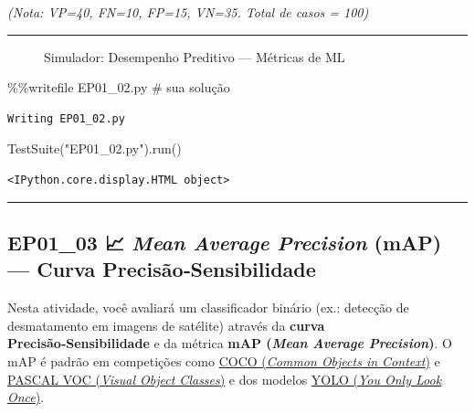 \documentclass[
  portuguese,
  letterpaper,
  openany,
  oneside,
  12pt,
  a4paper]{book}
\newenvironment{Shaded}{\begin{snugshade}}{\end{snugshade}}
\newcommand{\CommentTok}[1]{\textcolor[rgb]{0.37,0.37,0.37}{#1}}
\newcommand{\NormalTok}[1]{\textcolor[rgb]{0.00,0.23,0.31}{#1}}
\newcommand{\OperatorTok}[1]{\textcolor[rgb]{0.37,0.37,0.37}{#1}}
\newcommand{\StringTok}[1]{\textcolor[rgb]{0.13,0.47,0.30}{#1}}
\begin{document}
\emph{(Nota: VP=40, FN=10, FP=15, VN=35. Total de casos = 100)}

\begin{center}\rule{0.5\linewidth}{0.5pt}\end{center}

\begin{figure}


\caption{\label{fig-01-desempenho-preditivo}Simulador: Desempenho
Preditivo --- Métricas de ML}

\end{figure}%

\begin{Shaded}
\begin{Highlighting}[]
\OperatorTok{\%\%}\NormalTok{writefile EP01\_02.py}
\CommentTok{\# sua solução}
\end{Highlighting}
\end{Shaded}

\begin{verbatim}
Writing EP01_02.py
\end{verbatim}

\begin{Shaded}
\begin{Highlighting}[]
\NormalTok{TestSuite(}\StringTok{"EP01\_02.py"}\NormalTok{).run()}
\end{Highlighting}
\end{Shaded}

\begin{verbatim}
<IPython.core.display.HTML object>
\end{verbatim}

\begin{center}\rule{0.5\linewidth}{0.5pt}\end{center}

\subsection{\texorpdfstring{EP01\_03 📈 \emph{Mean Average Precision}
(mAP) --- Curva
Precisão‑Sensibilidade}{EP01\_03 📈 Mean Average Precision (mAP) --- Curva Precisão‑Sensibilidade}}\label{ep01_03-mean-average-precision-map-curva-precisuxe3osensibilidade}

Nesta atividade, você avaliará um classificador binário (ex.: detecção
de desmatamento em imagens de satélite) através da \textbf{curva
Precisão‑Sensibilidade} e da métrica \textbf{mAP (\emph{Mean Average
Precision})}. O mAP é padrão em competições como
\href{https://cocodataset.org/}{COCO (\emph{Common Objects in Context})}
e \href{http://host.robots.ox.ac.uk/pascal/VOC/}{PASCAL VOC
(\emph{Visual Object Classes})} e dos modelos
\href{https://github.com/ultralytics/ultralytics}{YOLO (\emph{You Only
Look Once})}.
\end{document}

